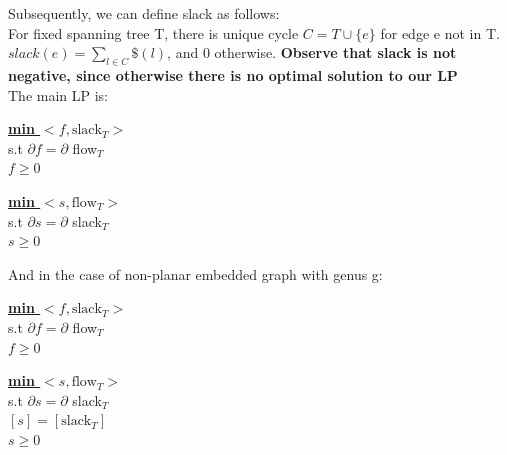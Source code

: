 \documentclass{article}
\begin{document}
Subsequently, we can define slack as follows: \\
For fixed spanning tree T, there is unique cycle $C = T \cup \{e\}$ for edge e 
not in T. $slack(e) = \sum_{l \in C} \$(l)$, and 0 otherwise.
\textbf{Observe that slack is not negative, since otherwise there is no optimal solution to our LP} \\
The main LP is:\\


\begin{minipage}[t]{0.48\linewidth}
\begin{center}
\begin{algorithm}
\textbf{\underline{min $<f, \text{slack}_{T}>$}} \\
  s.t  $\partial f =\partial $  flow$_T$ \\ \qquad
       $f \geq 0$
\end{algorithm}
\end{center}
\end{minipage}
\hfill
\begin{minipage}[t]{0.48\linewidth}
\begin{algorithm}
\textbf{\underline{min $<s, \text{flow}_{T}>$}} \\
  s.t  $\partial s = \partial $ slack$_T$ \\ \qquad
       $s \geq 0$
\end{algorithm}
\end{minipage}


And in the case of non-planar embedded graph with genus g:

\begin{minipage}[t]{0.48\linewidth}
\begin{center}
\begin{algorithm}
\textbf{\underline{min $<f, \text{slack}_{T}>$}} \\
  s.t  $\partial f =\partial $  flow$_T$ \\ \qquad
       $f \geq 0$
\end{algorithm}
\end{center}
\end{minipage}
\hfill
\begin{minipage}[t]{0.48\linewidth}
\begin{algorithm}
\textbf{\underline{min $<s, \text{flow}_{T}>$}} \\
  s.t  $\partial s = \partial $ slack$_T$ \\ \qquad
       $[s] = [\text{slack}_T]$ \\ \qquad
       $s \geq 0$
\end{algorithm}
\end{minipage}
\end{document}
